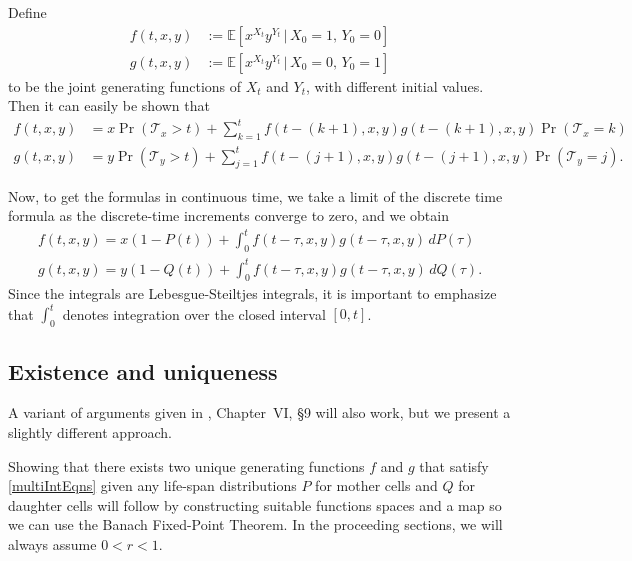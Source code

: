 \documentclass[12pt]{amsart}
\theoremstyle{plain}
\theoremstyle{definition}
\theoremstyle{remark}
\theoremstyle{definition}
\begin{document}
Define
\begin{equation}
\begin{aligned}
f(t,x,y) &:= \mathbb{E} \left[ x^{X_t} y^{Y_t} \, | \, X_0 = 1, \, Y_0 = 0 \right] \\
g(t,x,y) &:= \mathbb{E} \left[ x^{X_t} y^{Y_t} \, | \, X_0 = 0, \, Y_0 = 1 \right]
\end{aligned}
\end{equation}
to be the joint generating functions of $X_t$ and $Y_t$, with different initial values.  Then it can easily be shown that
\begin{equation}
\begin{aligned}
f(t,x,y) &= x\Pr(\mathcal{T}_x > t) + \sum_{k=1}^t f(t-(k+1),x,y)g(t-(k+1),x,y) \Pr(\mathcal{T}_x = k) \\
g(t,x,y) &= y\Pr(\mathcal{T}_y > t) + \sum_{j=1}^t f(t-(j+1),x,y)g(t-(j+1),x,y) \Pr(\mathcal{T}_y = j).
\end{aligned}
\end{equation}

Now, to get the formulas in continuous time, we take a limit of the discrete time formula as the discrete-time increments converge to zero, and we obtain
\begin{equation}
\begin{aligned}
\displaystyle f(t,x,y) = x(1-P(t)) + \int_0^t f(t-\tau,x,y)g(t-\tau,x,y)\,dP(\tau) \\
\displaystyle g(t,x,y) = y(1-Q(t)) + \int_0^t f(t-\tau,x,y)g(t-\tau,x,y)\,dQ(\tau).
\end{aligned} \label{multiIntEqns}
\end{equation}
Since the integrals are Lebesgue-Steiltjes integrals, it is important to emphasize that $\int_0^t$ denotes integration over the closed interval $[0,t]$.

\subsection{Existence and uniqueness} \label{multiExistence}

A variant of arguments given in \cite{harris}, Chapter~VI, \S9 will also work, but we present a slightly different approach.

Showing that there exists two unique generating functions $f$ and $g$ that satisfy \eqref{multiIntEqns} given any life-span distributions $P$ for mother cells and $Q$ for daughter cells will follow by constructing suitable functions spaces and a map so we can use the Banach Fixed-Point Theorem.  In the proceeding sections, we will always assume $0 < r < 1$. 
\end{document}
